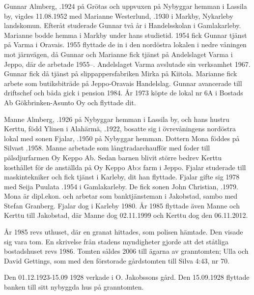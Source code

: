 Gunnar Almberg, .1924 på Grötas och uppvuxen på Nybyggar hemman i Lassila by, vigdes 11.08.1952 med Marianne Westerlund, .1930 i Markby, Nykarleby landskomun. Efteråt studerade Gunnar två år i Handelsskolan i Gamlakarleby. Marianne bodde hemma i Markby under hans studietid. 1954 fick Gunnar tjänst på Varma i Oravais. 1955 flyttade de in i den nordöstra lokalen i nedre våningen mot järnvägen, då Gunnar och Marianne fick tjänst på Andelslaget Varma i Jeppo, där de arbetade 1955--. Andelslaget Varma avslutade sin verksamhet 1967. Gunnar fick då tjänst på slippappersfabriken Mirka på Kiitola. Marianne fick arbete som butiksbiträde på Jeppo-Oravais Handelslag. Gunnar avancerade till driftschef och båda gick i pension 1984. År 1973 köpte de lokal nr 6A i Bostads Ab Gökbrinken-Asunto Oy och flyttade dit.

Manne Almberg, .1926 på Nybyggar hemman i Lassila by, och hans hustru Kerttu, född Ylinen i Alahärmä, .1922, bosatte sig i övrevåningens nordöstra lokal med sonen Fjalar, .1950 på Nybyggar hemman. Dottern Mona föddes på Silvast .1958. Manne arbetade som långtradarchaufför med foder till pälsdjurfarmen Oy Keppo Ab. Sedan barnen blivit större bedrev Kerttu kosthållet för de anställda på Oy Keppo Ab:s farm i Jeppo.  Fjalar studerade till maskintekniker och fick tjänst i Karleby, dit han flyttade. Fjalar gifte sig 1978 med Seija Puulata .1954 i Gamlakarleby. De fick sonen John Christian, .1979. Mona är dipl.ekon. och arbetar som banktjänsteman i Jakobstad, sambo med Stefan Granberg. Fjalar dog i Karleby 1980. År 1985 flyttade även Manne och Kerttu till Jakobstad, där Manne dog 02.11.1999 och Kerttu dog den 06.11.2012.

År 1985 revs uthuset, där en granat hittades, som polisen hämtade. Den visade sig vara tom. En skrivelse från stadens myndigheter gjorde att det ståtliga bostadshuset revs 1986. Tomten såldes 2006 till ägarna av granntomten; Ulla och David Gettings, som med den förstorade gårdstomten till Silva 4:43, nr 70.


%


Den 01.12.1923-15.09 1928 verkade  i O. Jakobssons gård. Den 15.09.1928 flyttade banken till sitt nybyggda hus på granntomten.

